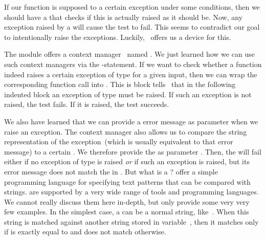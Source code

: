 If our function is supposed to  a certain exception under some conditions, then we should have a  that checks if this  is actually raised as it should be.
Now, any exception raised by a  will cause the test to fail.
This seems to contradict our goal to intentionally raise the exceptions.
Luckily, \pytest\ offers us a device for this.

The  module offers a context manager~\cite{PSF:P3D:TPSL:CUFWSC} named .
We just learned how we can use such context managers via the -statement.
If we want to check whether a function indeed raises a certain exception of type  for a given input, then we can wrap the corresponding function call into .
This is block tells \pytest\ that in the following indented block an exception of type  must be raised.
If such an exception is not raised, the test fails.
If it is raised, the test succeeds.

We also have learned that we can provide a error message as parameter when we raise an exception.
The  context manager also allows us to compare the string representation of the exception~(which is usually equivalent to that error message) to a certain .
We therefore provide the  as parameter .
Then, the  will fail either if no exception of type  is raised \emph{or} if such an exception is raised, but its error message does not match the  in .%
%
%
\FloatBarrier%
%
%
%
%
%
%
%
But what is a ?
 offer a simple programming language for specifying text patterns that can be compared with strings.
 are supported by a very wide range of tools and programming languages.
We cannot really discuss them here in-depth, but only provide some very very few examples.
In the simplest case, a  can be a normal string, like~.
When this string is matched against another string stored in variable~, then it matches only if  is exactly equal to  and does not match otherwise.

